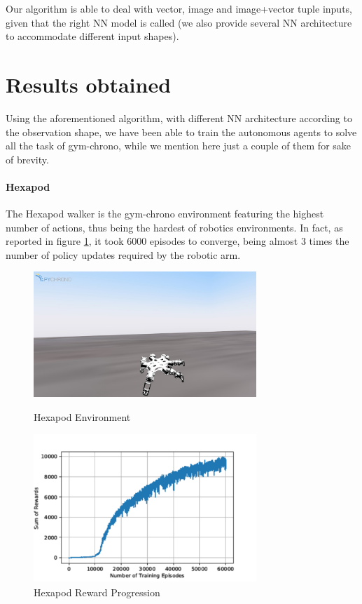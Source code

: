 \documentclass{svproc}
\begin{document}
Our algorithm is able to deal with vector, image and image+vector tuple inputs, given that the right NN model is called (we also provide several NN architecture to accommodate different input shapes).

\section{Results obtained}
Using the aforementioned algorithm, with different NN architecture according to the observation shape, we have been able to train the autonomous agents to solve all the task of gym-chrono, while we mention here just a couple of them for sake of brevity.

\paragraph{Hexapod}
The Hexapod walker is the gym-chrono environment featuring the highest number of actions, thus being the hardest of robotics environments. In fact, as reported in figure \ref{fig:Hexa_rew}, it took 6000 episodes to converge, being almost 3 times the number of policy updates required by the robotic arm.

\begin{figure}[ht]
 \begin{minipage}[b]{0.6\linewidth}
    \centering
    \includegraphics[width=0.75\textwidth]{Figures/Hexapod.jpg}
    \caption{Hexapod Environment}
    \label{fig:Hexa}
 \end{minipage}
 \begin{minipage}[b]{0.6\linewidth}
    \centering
    \includegraphics[width=0.75\textwidth]{Figures/hexa_rew.png}
    \caption{Hexapod Reward Progression}
    \label{fig:Hexa_rew}
 \end{minipage}
\end{figure}
\end{document}

